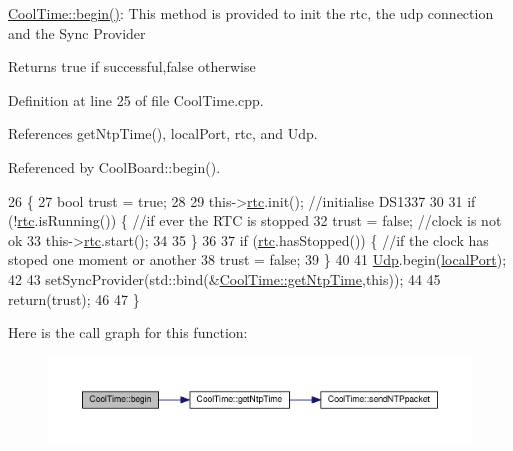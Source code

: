 \hyperlink{classCoolTime_a2b36c4009f083ece2d407fec077c4938}{Cool\+Time\+::begin()}\+: This method is provided to init the rtc, the udp connection and the Sync Provider

\begin{DoxyReturn}{Returns}
true if successful,false otherwise 
\end{DoxyReturn}


Definition at line 25 of file Cool\+Time.\+cpp.



References get\+Ntp\+Time(), local\+Port, rtc, and Udp.



Referenced by Cool\+Board\+::begin().


\begin{DoxyCode}
26 \{
27     \textcolor{keywordtype}{bool} trust = \textcolor{keyword}{true};
28 
29     this->\hyperlink{classCoolTime_afa77d58c0c21cfe8b7c27e34d82f07b9}{rtc}.init();                                                          \textcolor{comment}{//initialise DS1337}
30 
31     \textcolor{keywordflow}{if} (!\hyperlink{classCoolTime_afa77d58c0c21cfe8b7c27e34d82f07b9}{rtc}.isRunning()) \{                                                   \textcolor{comment}{//if ever the RTC is
       stopped}
32         trust = \textcolor{keyword}{false};                                                          \textcolor{comment}{//clock is not ok}
33         this->\hyperlink{classCoolTime_afa77d58c0c21cfe8b7c27e34d82f07b9}{rtc}.start();
34 
35     \}
36 
37     \textcolor{keywordflow}{if} (\hyperlink{classCoolTime_afa77d58c0c21cfe8b7c27e34d82f07b9}{rtc}.hasStopped()) \{                                                   \textcolor{comment}{//if the clock has stoped
       one moment or another}
38         trust = \textcolor{keyword}{false};
39     \}
40 
41     \hyperlink{classCoolTime_a4e23216a8121ca79d0fb019f30884b92}{Udp}.begin(\hyperlink{classCoolTime_a2f777da44d7ba678be8185299e9b49d1}{localPort});
42     
43     setSyncProvider(std::bind(&\hyperlink{classCoolTime_a41fbbbfd651c2079f54d4b2911e4c705}{CoolTime::getNtpTime},\textcolor{keyword}{this}));
44 
45     \textcolor{keywordflow}{return}(trust);
46 
47 \}
\end{DoxyCode}
Here is the call graph for this function\+:
\nopagebreak
\begin{figure}[H]
\begin{center}
\leavevmode
\includegraphics[width=350pt]{classCoolTime_a2b36c4009f083ece2d407fec077c4938_cgraph}
\end{center}
\end{figure}
